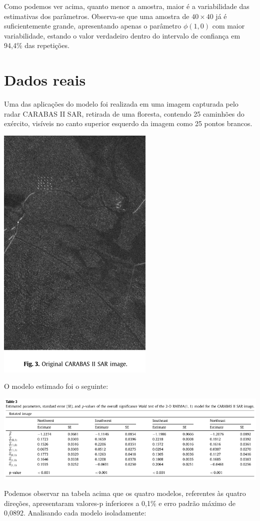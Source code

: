 \documentclass[
]{article}
\begin{document}
Como podemos ver acima, quanto menor a amostra, maior é a variabilidade das estimativas dos parâmetros. Observa-se que uma amostra de \(40\times40\) já é suficientemente grande, apresentando apenas o parâmetro \(\phi(1,0)\) com maior variabilidade, estando o valor verdadeiro dentro do intervalo de confiança em 94,4\% das repetições.

\hypertarget{dados-reais}{%
\section{Dados reais}\label{dados-reais}}

Uma das aplicações do modelo foi realizada em uma imagem capturada pelo radar CARABAS II SAR, retirada de uma floresta, contendo 25 caminhões do exército, visíveis no canto superior esquerdo da imagem como 25 pontos brancos.

\begin{center}\includegraphics[width=0.3\linewidth]{carabas} \end{center}

O modelo estimado foi o seguinte:

\begin{center}\includegraphics[width=0.7\linewidth]{table_03} \end{center}

Podemos observar na tabela acima que os quatro modelos, referentes às quatro direções, apresentaram valores-p inferiores a 0,1\% e erro padrão máximo de 0,0892. Analisando cada modelo isoladamente:
\end{document}
